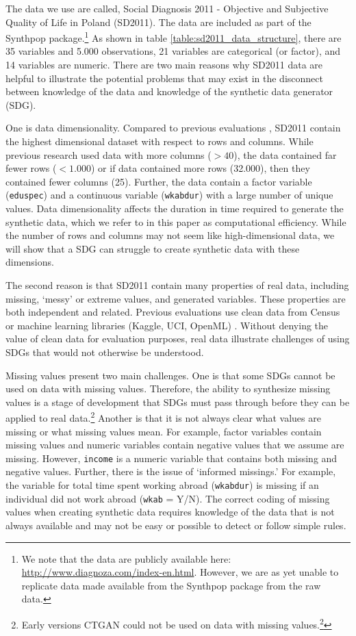 \documentclass[runningheads]{llncs}
\begin{document}
The data we use are called, Social Diagnosis 2011 - Objective and Subjective Quality of Life in Poland (SD2011).  The data are included as part of the Synthpop package.\footnote{We note that the data are publicly available here: \url{http://www.diagnoza.com/index-en.html}.  However, we are as yet unable to replicate data made available from the Synthpop package from the raw data.}  As shown in table \ref{table:sd2011_data_structure}, there are 35 variables and 5.000 observations, 21 variables are categorical (or factor), and 14 variables are numeric.  There are two main reasons why SD2011 data are helpful to illustrate the potential problems that may exist in the disconnect between knowledge of the data and knowledge of the synthetic data generator (SDG).  

One is data dimensionality. Compared to previous evaluations \cite{dankar2021fake,little2022comparing}, SD2011 contain the highest dimensional dataset with respect to rows and columns.  While previous research used data with more columns ($> 40$), the data contained far fewer rows ($< 1.000$) or if data contained more rows (32.000), then they contained fewer columns (25).  Further, the data contain a factor variable (\texttt{eduspec}) and a continuous variable (\texttt{wkabdur}) with a large number of unique values.  Data dimensionality affects the duration in time required to generate the synthetic data, which we refer to in this paper as computational efficiency.  While the number of rows and columns may not seem like high-dimensional data, we will show that a SDG can struggle to create synthetic data with these dimensions.

The second reason is that SD2011 contain many properties of real data, including missing, `messy' or extreme values, and generated variables.  These properties are both independent and related.  Previous evaluations use clean data from Census \cite{little2022comparing} or machine learning libraries (Kaggle, UCI, OpenML) \cite{dankar2021fake}.  Without denying the value of clean data for evaluation purposes, real data illustrate challenges of using SDGs that would not otherwise be understood.  

Missing values present two main challenges.  One is that some SDGs cannot be used on data with missing values.  Therefore, the ability to synthesize missing values is a stage of development that SDGs must pass through before they can be applied to real data.\footnote{Early versions CTGAN could not be used on data with missing values.\footnote{\url{https://github.com/sdv-dev/CTGAN/issues/39}}}  Another is that it is not always clear what values are missing or what missing values mean.  For example, factor variables contain missing values and numeric variables contain negative values that we assume are missing.  However, \texttt{income} is a numeric variable that contains both missing and negative values.   Further, there is the issue of `informed missings.'  For example, the variable for total time spent working abroad (\texttt{wkabdur}) is missing if an individual did not work abroad (\texttt{wkab} = Y/N).  The correct coding of missing values when creating synthetic data requires knowledge of the data that is not always available and may not be easy or possible to detect or follow simple rules.
\end{document}
